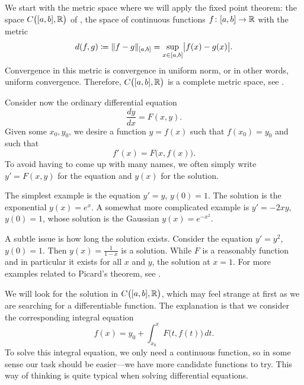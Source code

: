 We start with the metric space where we will apply the
fixed point theorem:
the space $C\bigl([a,b],{\mathbb{R}}\bigr)$ of ,
the space of continuous functions $f \colon [a,b] \to {\mathbb{R}}$ with the metric
\begin{equation*}
d(f,g) \coloneqq \lVert {f-g} \rVert_{[a,b]} = \sup_{x \in [a,b]} \bigl\lvert {f(x)-g(x)} \bigr\rvert .
\end{equation*}
Convergence in this metric is convergence in uniform norm, or in other
words, uniform convergence.  Therefore,
$C\bigl([a,b],{\mathbb{R}}\bigr)$ is a complete metric space,
see .

\medskip

Consider now the ordinary differential equation
\begin{equation*}
\frac{dy}{dx} = F(x,y) .
\end{equation*}
Given some $x_0, y_0$, we desire a function $y=f(x)$ such that
$f(x_0) = y_0$ and such that
\begin{equation*}
f'(x) = F\bigl(x,f(x)\bigr) .
\end{equation*}
To avoid having to come up with many names, we often simply write $y' = F(x,y)$
for the equation
and $y(x)$ for the solution.

The simplest example is the equation $y' = y$, $y(0) = 1$.
The solution is the exponential $y(x) = e^x$.  A somewhat more complicated
example is $y' = -2xy$, $y(0) = 1$, whose solution is the Gaussian
$y(x) = e^{-x^2}$.

A subtle issue is how long the solution exists.
Consider the equation $y' = y^2$, $y(0)=1$.  Then $y(x) = \frac{1}{1-x}$ is a
solution.  While $F$ is a reasonably  function and in particular
it exists for all $x$ and $y$, the solution  at $x=1$.
For more examples related to Picard's theorem, see .

We will look for the solution in 
$C\bigl([a,b],{\mathbb{R}}\bigr)$, which may feel strange at first as
we are searching for a differentiable function.
The explanation is that we consider the
corresponding integral equation
\begin{equation*}
f(x)
=
y_0 + \int_{x_0}^x F\bigl(t,f(t)\bigr)\,dt .
\end{equation*}
To solve this integral equation, we only need a continuous function, so
in some sense our task should be easier---we have more candidate functions
to try.  This way of thinking is quite typical when solving differential
equations.

